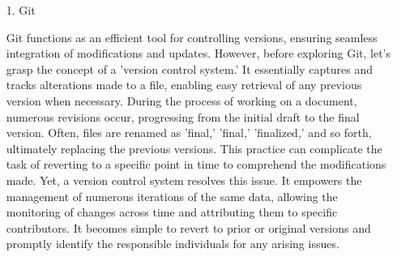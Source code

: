 \documentclass[conference]{IEEEtran}
\begin{document}
\begin{enumerate}
    \begin{enumerate}
        \item[1.]Git \cite{velog-git}
        \item[]Git functions as an efficient tool for controlling versions, ensuring seamless integration of modifications and updates. However, before exploring Git, let's grasp the concept of a 'version control system.' It essentially captures and tracks alterations made to a file, enabling easy retrieval of any previous version when necessary. During the process of working on a document, numerous revisions occur, progressing from the initial draft to the final version. Often, files are renamed as 'final,' 'final,' 'finalized,' and so forth, ultimately replacing the previous versions. This practice can complicate the task of reverting to a specific point in time to comprehend the modifications made. Yet, a version control system resolves this issue. It empowers the management of numerous iterations of the same data, allowing the monitoring of changes across time and attributing them to specific contributors. It becomes simple to revert to prior or original versions and promptly identify the responsible individuals for any arising issues.\\
    \end{enumerate}
\end{enumerate}
\end{document}
